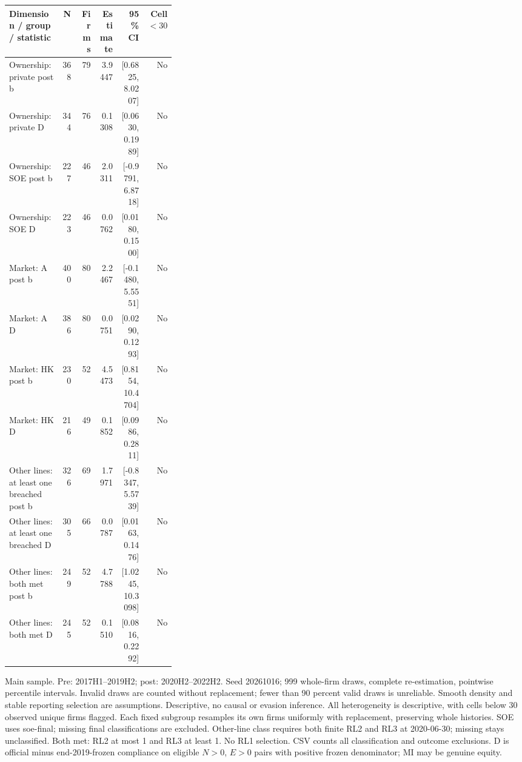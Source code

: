 \begingroup\scriptsize\setlength{\tabcolsep}{3pt}
\begin{threeparttable}
\begin{tabular}{p{0.32\linewidth}rrrrr}
\toprule
Dimension / group / statistic & N & Firms & Estimate & 95\% CI & Cell $<30$ \\
\midrule
Ownership: private post b & 368 & 79 & 3.9447 & [0.6825, 8.0207] & No \\
Ownership: private D & 344 & 76 & 0.1308 & [0.0630, 0.1989] & No \\
Ownership: SOE post b & 227 & 46 & 2.0311 & [-0.9791, 6.8718] & No \\
Ownership: SOE D & 223 & 46 & 0.0762 & [0.0180, 0.1500] & No \\
Market: A post b & 400 & 80 & 2.2467 & [-0.1480, 5.5551] & No \\
Market: A D & 386 & 80 & 0.0751 & [0.0290, 0.1293] & No \\
Market: HK post b & 230 & 52 & 4.5473 & [0.8154, 10.4704] & No \\
Market: HK D & 216 & 49 & 0.1852 & [0.0986, 0.2811] & No \\
Other lines: at least one breached post b & 326 & 69 & 1.7971 & [-0.8347, 5.5739] & No \\
Other lines: at least one breached D & 305 & 66 & 0.0787 & [0.0163, 0.1476] & No \\
Other lines: both met post b & 249 & 52 & 4.7788 & [1.0245, 10.3098] & No \\
Other lines: both met D & 245 & 52 & 0.1510 & [0.0816, 0.2292] & No \\
\bottomrule
\end{tabular}
\begin{tablenotes}[flushleft]\footnotesize
\item[] Main sample. Pre: 2017H1--2019H2; post: 2020H2--2022H2. Seed 20261016; 999 whole-firm draws, complete re-estimation, pointwise percentile intervals. Invalid draws are counted without replacement; fewer than 90 percent valid draws is unreliable. Smooth density and stable reporting selection are assumptions. Descriptive, no causal or evasion inference. All heterogeneity is descriptive, with cells below 30 observed unique firms flagged. Each fixed subgroup resamples its own firms uniformly with replacement, preserving whole histories. SOE uses soe-final; missing final classifications are excluded. Other-line class requires both finite RL2 and RL3 at 2020-06-30; missing stays unclassified. Both met: RL2 at most 1 and RL3 at least 1. No RL1 selection. CSV counts all classification and outcome exclusions. D is official minus end-2019-frozen compliance on eligible $N>0$, $E>0$ pairs with positive frozen denominator; MI may be genuine equity.
\end{tablenotes}
\end{threeparttable}
\endgroup
\par\medskip
